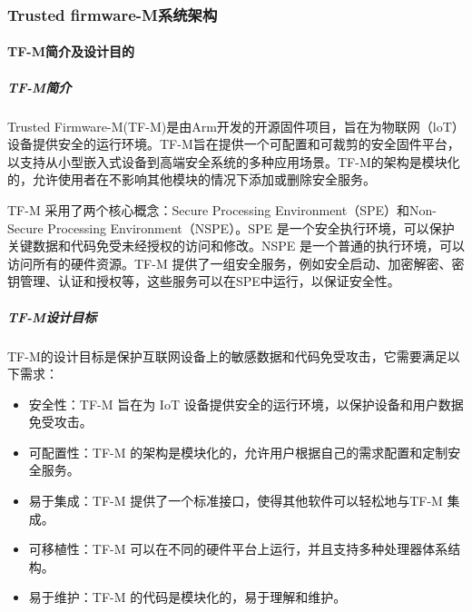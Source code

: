 \documentclass[12pt,a4paper]{ctexart}
\begin{document}
\subsubsection{Trusted firmware-M系统架构}
\paragraph{TF-M简介及设计目的}
\subparagraph{TF-M简介}
\par Trusted Firmware-M(TF-M)是由Arm开发的开源固件项目，旨在为物联网（loT）设备提供安全的运行环境。TF-M旨在提供一个可配置和可裁剪的安全固件平台，以支持从小型嵌入式设备到高端安全系统的多种应用场景。TF-M的架构是模块化的，允许使用者在不影响其他模块的情况下添加或删除安全服务。
\par TF-M 采用了两个核心概念：Secure Processing Environment（SPE）和Non-Secure Processing Environment（NSPE）。SPE 是一个安全执行环境，可以保护关键数据和代码免受未经授权的访问和修改。NSPE 是一个普通的执行环境，可以访问所有的硬件资源。TF-M 提供了一组安全服务，例如安全启动、加密解密、密钥管理、认证和授权等，这些服务可以在SPE中运行，以保证安全性。

\subparagraph{TF-M设计目标}
\par TF-M的设计目标是保护互联网设备上的敏感数据和代码免受攻击，它需要满足以下需求：
\begin{itemize}
    \item 安全性：TF-M 旨在为 IoT 设备提供安全的运行环境，以保护设备和用户数据免受攻击。
    \item 可配置性：TF-M 的架构是模块化的，允许用户根据自己的需求配置和定制安全服务。
    \item 易于集成：TF-M 提供了一个标准接口，使得其他软件可以轻松地与TF-M 集成。
    \item 可移植性：TF-M 可以在不同的硬件平台上运行，并且支持多种处理器体系结构。
    \item 易于维护：TF-M 的代码是模块化的，易于理解和维护。
\end{itemize}
\end{document}
